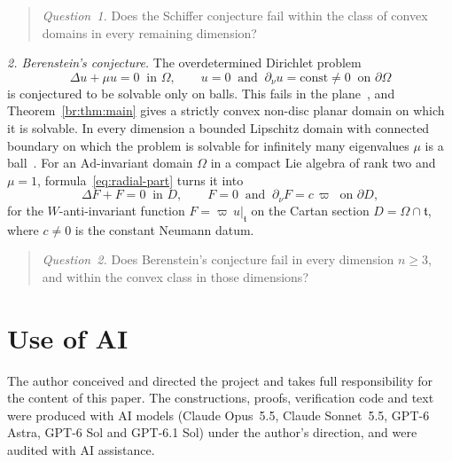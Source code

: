 \documentclass[11pt]{amsart}
\theoremstyle{definition}
\theoremstyle{remark}
\numberwithin{equation}{section}
\begin{document}
\begin{quote}
\emph{Question~1.}
Does the Schiffer conjecture fail within the class of convex domains in every remaining dimension?
\end{quote}

\emph{2. Berenstein's conjecture.} The overdetermined Dirichlet problem
\[
\Delta u+\mu u=0\ \text{ in }\Omega,\qquad u=0\ \text{ and }\ \partial_\nu u=\text{const}\neq0\ \text{ on }\partial\Omega
\]
is conjectured to be solvable only on balls. This fails in the plane~\cite{CSS26}, and Theorem~\ref{br:thm:main} gives a strictly convex non-disc planar domain on which it is solvable. In every dimension a bounded Lipschitz domain with connected boundary on which the problem is solvable for infinitely many eigenvalues $\mu$ is a ball~\cite[Theorem~1]{BY87}. For an $\mathrm{Ad}$-invariant domain $\Omega$ in a compact Lie algebra of rank two and $\mu=1$, formula~\eqref{eq:radial-part} turns it into
\[
\Delta F+F=0\ \text{ in }D,\qquad F=0\ \text{ and }\ \partial_\nu F=c\,\varpi\ \text{ on }\partial D,
\]
for the $W$-anti-invariant function $F=\varpi\,u|_{\mathfrak t}$ on the Cartan section $D=\Omega\cap\mathfrak t$, where $c\neq0$ is the constant Neumann datum.

\begin{quote}
\emph{Question~2.} Does Berenstein's conjecture fail in every dimension $n\geq3$, and within the convex class in those dimensions?
\end{quote}

\section*{Use of AI}
The author conceived and directed the project and takes full responsibility for the content of this paper. The constructions, proofs, verification code and text were produced with AI models (Claude Opus~5.5, Claude Sonnet~5.5, GPT-6 Astra, GPT-6 Sol and GPT-6.1 Sol) under the author's direction, and were audited with AI assistance.
\end{document}
